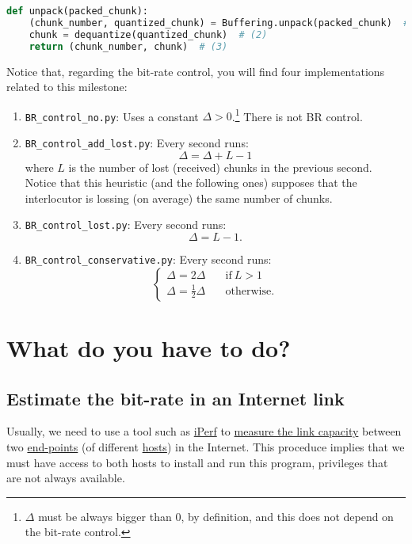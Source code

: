 \begin{lstlisting}[language=Python]
  def unpack(packed_chunk):
    (chunk_number, quantized_chunk) = Buffering.unpack(packed_chunk)  # (1)
    chunk = dequantize(quantized_chunk)  # (2)
    return (chunk_number, chunk)  # (3)
\end{lstlisting}

Notice that, regarding the bit-rate control, you will find four
implementations related to this milestone:
\begin{enumerate}
\item \verb|BR_control_no.py|: Uses a constant
  $\Delta>0$.\footnote{$\Delta$ must be always bigger than $0$, by
definition, and this does not depend on the bit-rate control.} There
  is not BR control.
\item \verb|BR_control_add_lost.py|: Every second runs:
  \begin{equation}
    \Delta = \Delta + L - 1
  \end{equation}
  where $L$ is the number of lost (received) chunks in the previous
  second. Notice that this heuristic (and the following ones) supposes
  that the interlocutor is lossing (on average) the same number of
  chunks.
\item \verb|BR_control_lost.py|: Every second runs:
  \begin{equation}
    \Delta = L - 1.
  \end{equation}
\item \verb|BR_control_conservative.py|: Every second runs:
  \begin{equation}
    \left\{
    \begin{array}{ll}
      \Delta = 2\Delta & \quad\text{if}~L>1 \\
      \Delta = \frac{1}{2}\Delta & \quad\text{otherwise}.
    \end{array}
    \right.
  \end{equation}
\end{enumerate}


\section{What do you have to do?}
\subsection{Estimate the bit-rate in an Internet link}
Usually, we need to use a tool such as \href{https://iperf.fr/}{iPerf}
to
\href{https://en.wikipedia.org/wiki/Measuring_network_throughput}{measure
  the link capacity} between
two \href{https://datatracker.ietf.org/doc/html/rfc4113}{end-points}
(of
different \href{https://en.wikipedia.org/wiki/Host_(network)}{hosts})
in the Internet. This proceduce implies that we must have access to
both hosts to install and run this program, privileges that are not
always available.

